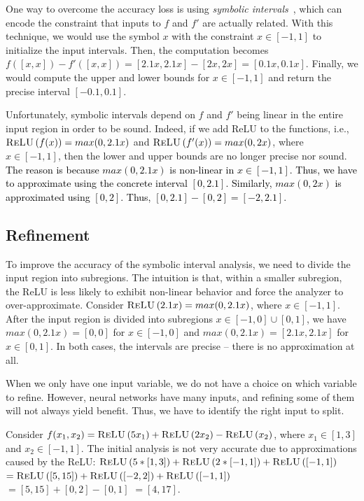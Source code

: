 One way to overcome the accuracy loss is using \textit{symbolic
intervals}~\cite{WangPWYJ18}, which can encode the constraint that
inputs to $ f $ and $ f' $ are actually related.  With this technique,
we would use the symbol $ x $ with the constraint $ x \in [-1,1] $ to
initialize the input intervals. Then, the computation becomes $ f([x,
x]) - f'([x,x]) = [2.1x, 2.1x] - [2x, 2x] = [0.1x, 0.1x] $. Finally,
we would compute the upper and lower bounds for $x\in [-1,1]$ and
return the precise interval $ [-0.1, 0.1] $.


Unfortunately, symbolic intervals depend on $ f $ and $ f' $ being
linear in the entire input region in order to be sound.  Indeed, if we
add ReLU to the functions, i.e., $\textsc{ReLU}\left( f(x) \right) = max(0,2.1x) $
and $\textsc{ReLU}\left( f'(x) \right) = max(0,2x) $, where $x\in [-1,1]$, then the
lower and upper bounds are no longer precise nor sound.
%
\textcolor{black}{
%
The reason is because $max(0, 2.1x)$ is non-linear in $x\in [-1,1]$.
Thus, we have to approximate using the concrete interval $[0,2.1]$.
Similarly, $max(0,2x)$ is approximated using $[0,2]$.  Thus, $[0, 2.1]
- [0, 2] = [-2, 2.1]$.
%
}


\subsection{Refinement}

To improve the accuracy of the symbolic interval analysis, we need to
divide the input region into subregions.  The intuition is that,
within a smaller subregion, the ReLU is less likely to exhibit
non-linear behavior and force the analyzer to over-approximate.
Consider $\textsc{ReLU}\left(2.1x\right) = max(0, 2.1x)$, where $x\in
[-1,1]$. After the input region is divided into subregions $x\in
[-1,0] \cup [0,1]$, we have $max(0,2.1x) = [0,0]$ for $x\in[-1,0]$ and
$max(0,2.1x) = [2.1x,2.1x]$ for $x\in[0,1]$.  In both cases, the
intervals are precise -- there is no approximation at all.


When we only have one input variable, we do not have a choice on which
variable to refine. However, neural networks have many inputs, and
refining some of them will not always yield benefit. Thus, we have to
identify the right input to split.


Consider $f(x_1,x_2) = \textsc{ReLU}\left(5x_1\right) + \textsc{ReLU}\left(2x_2\right)
- \textsc{ReLU}\left(x_2\right)$, where $x_1\in [1,3]$ and $x_2\in [-1,1]$.
%
The initial analysis is not very accurate due to approximations caused
by the ReLU:
%
$\textsc{ReLU}\left(5 * [1,3]\right) + \textsc{ReLU}\left(2* [-1,1]\right) + \textsc{ReLU}\left( [-1,1] \right)$
%
$=  \textsc{ReLU}\left([5,15]\right) + \textsc{ReLU}\left([-2,2]\right) + \textsc{ReLU}\left([-1,1]\right)$
%
$=  [5,15] + [0,2] - [0,1]$
%
$=  [4,17]$.


